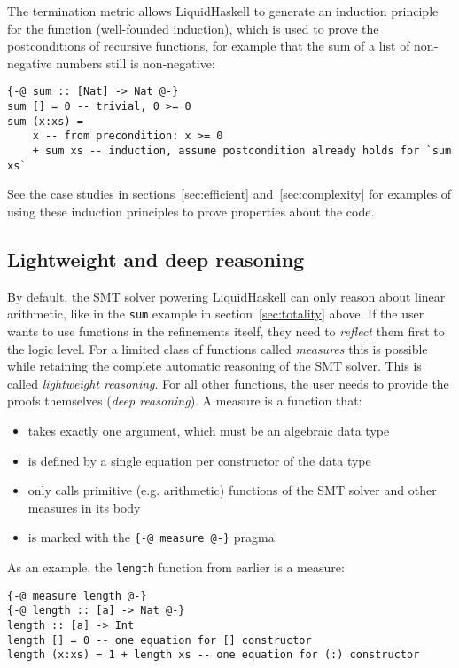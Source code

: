 \documentclass[acmlarge,screen,authorversion=true,nonacm=true]{acmart}
\begin{document}
The termination metric allows LiquidHaskell to generate an induction principle for the function (well-founded induction), which is used to prove the postconditions of recursive functions, for example that the sum of a list of non-negative numbers still is non-negative:

\begin{lstlisting}
{-@ sum :: [Nat] -> Nat @-}
sum [] = 0 -- trivial, 0 >= 0
sum (x:xs) =
    x -- from precondition: x >= 0
    + sum xs -- induction, assume postcondition already holds for `sum xs`
\end{lstlisting}

See the case studies in sections~\ref{sec:efficient} and~\ref{sec:complexity} for examples of using these induction principles to prove properties about the code.

\subsection{Lightweight and deep reasoning}\label{sec:reasoning}

By default, the SMT solver powering LiquidHaskell can only reason about linear arithmetic, like in the \texttt{sum} example in section~\ref{sec:totality} above. If the user wants to use functions in the refinements itself, they need to \textit{reflect} them first to the logic level. For a limited class of functions called \textit{measures} this is possible while retaining the complete automatic reasoning of the SMT solver. This is called \textit{lightweight reasoning}. For all other functions, the user needs to provide the proofs themselves (\textit{deep reasoning}). A measure is a function that:
\begin{itemize}
\item{takes exactly one argument, which must be an algebraic data type}
\item{is defined by a single equation per constructor of the data type}
\item{only calls primitive (e.g. arithmetic) functions of the SMT solver and other measures in its body}
\item{is marked with the \texttt{\{-@ measure @-\}} pragma}
\end{itemize}

As an example, the \texttt{length} function from earlier is a measure:

\begin{lstlisting}
{-@ measure length @-}
{-@ length :: [a] -> Nat @-}
length :: [a] -> Int
length [] = 0 -- one equation for [] constructor
length (x:xs) = 1 + length xs -- one equation for (:) constructor
\end{lstlisting}
\end{document}
